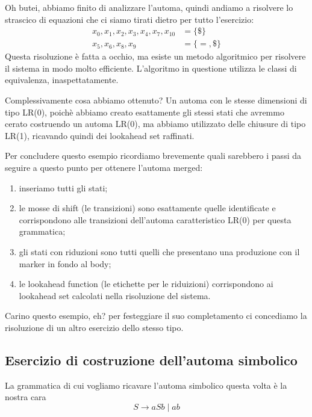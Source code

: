 \documentclass[class=book, crop=false, oneside, 12pt]{standalone}
\begin{document}
Oh butei, abbiamo finito di analizzare l'automa, quindi andiamo a risolvere lo strascico di equazioni che ci siamo tirati dietro per tutto l'esercizio:
\begin{align*}
    x_0, x_1, x_2, x_3, x_4, x_7, x_{10} &= \{\$\} \\
    x_5, x_6, x_8, x_9 &= \{=, \$\}
\end{align*}
Questa risoluzione è fatta a occhio, ma esiste un metodo algoritmico per risolvere il sistema in modo molto efficiente.
L'algoritmo in questione utilizza le classi di equivalenza, inaspettatamente.

Complessivamente cosa abbiamo ottenuto?
Un automa con le stesse dimensioni di tipo LR(0), poichè abbiamo creato esattamente gli stessi stati che avremmo cerato costruendo un automa LR(0), ma abbiamo utilizzato delle chiusure di tipo LR(1), ricavando quindi dei lookahead set raffinati.

Per concludere questo esempio ricordiamo brevemente quali sarebbero i passi da seguire a questo punto per ottenere l'automa merged:
\begin{enumerate}
    \item inseriamo tutti gli stati;
    \item le mosse di shift (le transizioni) sono esattamente quelle identificate e corrispondono alle transizioni dell'automa caratteristico LR(0) per questa grammatica;
    \item gli stati con riduzioni sono tutti quelli che presentano una produzione con il marker in fondo al body;
    \item le lookahead function (le etichette per le riduizioni) corrispondono ai lookahead set calcolati nella risoluzione del sistema.
\end{enumerate}
Carino questo esempio, eh? per festeggiare il suo completamento ci concediamo la risoluzione di un altro esercizio dello stesso tipo.

\subsection{Esercizio di costruzione dell'automa simbolico}
La grammatica di cui vogliamo ricavare l'automa simbolico questa volta è la nostra cara
\begin{equation}
    S \to aSb \mid ab
\end{equation}
\end{document}
